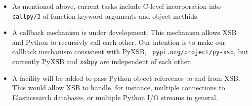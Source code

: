 \begin{itemize}
\item As mentioned above, current tasks include C-level incorporation
  into {\tt callpy/3} of function keyword arguments and object
  methids.

\item A callback mechanism is under development.  This mechanism
  allows XSB and Python to recursivly call each other.  Our intention
  is to make our callback mechanism consistent with PyXSB, {\tt
    pypi.org/project/py-xsb}, but currently PyXSB and {\tt xsbpy} are
  independent of each other.

\item A facility will be added to pass Python object referecnes to and
  from XSB.  This would allow XSB to handle, for instance, multiple
  connections to Elasticsearch databases, or multiple Python I/O
  streams in general.

\end{itemize}  
